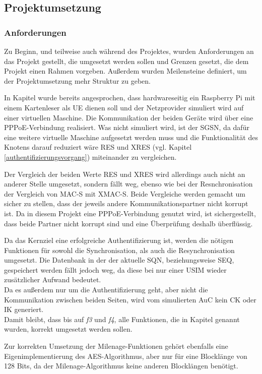 \subsection{Projektumsetzung}
 \subsubsection{Anforderungen}
 Zu Beginn, und teilweise auch während des Projektes, wurden Anforderungen
 an das Projekt gestellt, die umgesetzt werden sollen und Grenzen gesetzt, die
 dem Projekt einen Rahmen vorgeben. Außerdem wurden Meilensteine definiert,
 um der Projektumsetzung mehr Struktur zu geben.
 
 In Kapitel  wurde bereits angesprochen, dass hardwareseitig
 ein Raspberry Pi mit einem Kartenleser als \ac{UE} dienen soll und der Netzprovider
 simuliert wird auf einer virtuellen Maschine. Die Kommunikation der beiden Geräte
 wird über eine \ac{PPPoE}-Verbindung realisiert. Was nicht simuliert wird, ist der
 \ac{SGSN}, da dafür eine weitere virtuelle Maschine aufgesetzt werden muss und die
 Funktionalität des Knotens darauf reduziert wäre RES und XRES (vgl. Kapitel \ref{authentifizierungsvorgang})
 miteinander zu vergleichen.
 
 Der Vergleich der beiden Werte RES und XRES wird allerdings auch nicht an anderer
 Stelle umgesetzt, sondern fällt weg, ebenso wie bei der Resnchronisation der Vergleich
 von MAC-S mit XMAC-S. Beide Vergleiche werden gemacht um sicher zu stellen, dass
 der jeweils andere Kommunikationspartner nicht korrupt ist. Da in diesem Projekt eine
 PPPoE-Verbindung genutzt wird, ist sichergestellt, dass beide Partner nicht korrupt sind
 und eine Überprüfung deshalb überflüssig.
 
 Da das Kernziel eine erfolgreiche Authentifizierung ist, werden die nötigen Funktionen
 für sowohl die Synchronisation, als auch die Resynchronisation umgesetzt. Die Datenbank
 in der der aktuelle SQN, beziehungsweise SEQ, gespeichert werden fällt jedoch weg, da
 diese bei nur einer USIM wieder zusätzlicher Aufwand bedeutet. \\
 Da es außerdem nur um die Authentifizierung geht, aber nicht die Kommunikation zwischen
 beiden Seiten, wird vom simulierten AuC kein CK oder IK generiert. \\
 Damit bleibt, dass bis auf \emph{f3} und \emph{f4}, alle Funktionen, die in Kapitel 
 genannt wurden, korrekt umgesetzt werden sollen.
 
 Zur korrekten Umsetzung der Milenage-Funktionen gehört ebenfalls eine Eigen\-implementierung
 des AES-Algorithmus, aber nur für eine Blocklänge von 128 Bits, da der Milenage-Algorithmus
 keine anderen Blocklängen benötigt.
 
